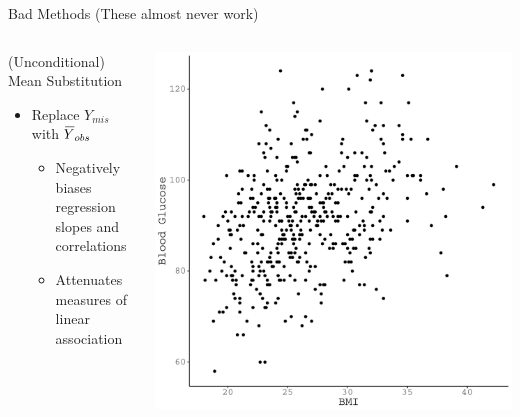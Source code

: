 \documentclass{beamer}\usepackage[]{graphicx}\usepackage[]{color}
\makeatletter
\def\maxwidth{ %
  \ifdim\Gin@nat@width>\linewidth
    \linewidth
  \else
    \Gin@nat@width
  \fi
}
\newenvironment{knitrout}{}{} %
\newcommand*\bigbar[1]{%
  \hbox{%
    \vbox{%
      \hrule height 0.65pt %
      \kern0.35ex%
      \hbox{%
        \kern-0.1em%
        \ensuremath{#1}%
      }%
    }%
  }%
}
\makeatother
\begin{document}
\begin{frame}{Bad Methods (These almost never work)}
  
  \begin{columns}
    \begin{column}{0.5\textwidth}
      
      (Unconditional) Mean Substitution
      \begin{itemize}
      \item Replace $Y_{mis}$ with $\bigbar{Y}_{obs}$
        \begin{itemize}
        \item Negatively biases regression slopes and correlations
        \item Attenuates measures of linear association
        \end{itemize}
      \end{itemize}
      
    \end{column}
    \begin{column}{0.5\textwidth}
      
\begin{knitrout}\footnotesize
{}\color{fgcolor}

{\centering \includegraphics[width=\maxwidth]{figure/unnamed-chunk-17-1} 

}



\end{knitrout}

\end{column}
\end{columns}

\end{frame}
\end{document}
